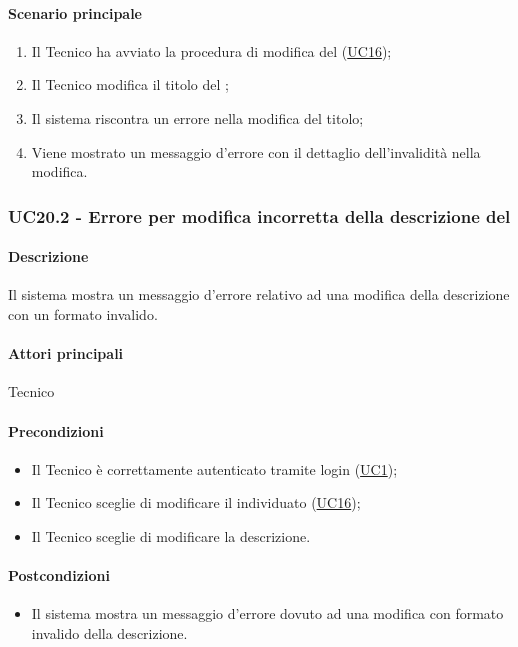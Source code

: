\paragraph*{Scenario principale}
\begin{enumerate}
  \item Il Tecnico ha avviato la procedura di modifica del  (\hyperref[UC16]{UC16});
  \item Il Tecnico modifica il titolo del ;
  \item Il sistema riscontra un errore nella modifica del titolo;
  \item Viene mostrato un messaggio d'errore con il dettaglio dell'invalidità nella modifica.  
\end{enumerate}


\subsubsection{UC20.2 - Errore per modifica incorretta della descrizione del }\label{UC20point2}
\paragraph*{Descrizione}
Il sistema mostra un messaggio d’errore relativo ad una modifica della descrizione con un formato invalido.

\paragraph*{Attori principali}
Tecnico

\paragraph*{Precondizioni}
\begin{itemize}
  \item Il Tecnico è correttamente autenticato tramite login (\hyperref[UC1]{UC1});
  \item Il Tecnico sceglie di modificare il  individuato (\hyperref[UC16]{UC16});
  \item Il Tecnico sceglie di modificare la descrizione.
\end{itemize}

\paragraph*{Postcondizioni}
\begin{itemize}
  \item Il sistema mostra un messaggio d’errore dovuto ad una modifica con formato invalido della descrizione.
\end{itemize}

